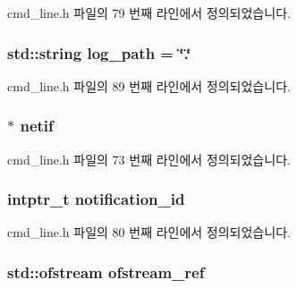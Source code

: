 cmd\+\_\+line.\+h 파일의 79 번째 라인에서 정의되었습니다.

\subsubsection[{\texorpdfstring{log\+\_\+path}{log_path}}]{\setlength{\rightskip}{0pt plus 5cm}std\+::string log\+\_\+path = \char`\"{}.\char`\"{}\hspace{0.3cm}{\ttfamily [static]}}\hypertarget{classcmd__line_ab9a5e2965a8a7be88b0a1e296d4cc0be}{}\label{classcmd__line_ab9a5e2965a8a7be88b0a1e296d4cc0be}


cmd\+\_\+line.\+h 파일의 89 번째 라인에서 정의되었습니다.

\subsubsection[{\texorpdfstring{netif}{netif}}]{$\ast$ {\bf netif}\hspace{0.3cm}{\ttfamily [private]}}\hypertarget{classcmd__line_a4ec0982fdb42fd40e3eba96b9a847471}{}\label{classcmd__line_a4ec0982fdb42fd40e3eba96b9a847471}


cmd\+\_\+line.\+h 파일의 73 번째 라인에서 정의되었습니다.

\subsubsection[{\texorpdfstring{notification\+\_\+id}{notification_id}}]{\setlength{\rightskip}{0pt plus 5cm}intptr\+\_\+t notification\+\_\+id\hspace{0.3cm}{\ttfamily [private]}}\hypertarget{classcmd__line_aac6422549eb9ba4b722bf21a0a401718}{}\label{classcmd__line_aac6422549eb9ba4b722bf21a0a401718}


cmd\+\_\+line.\+h 파일의 80 번째 라인에서 정의되었습니다.

\subsubsection[{\texorpdfstring{ofstream\+\_\+ref}{ofstream_ref}}]{\setlength{\rightskip}{0pt plus 5cm}std\+::ofstream ofstream\+\_\+ref\hspace{0.3cm}{\ttfamily [private]}}\hypertarget{classcmd__line_a8ecbb7e6f42fc1b6d974b169f0baa229}{}\label{classcmd__line_a8ecbb7e6f42fc1b6d974b169f0baa229}


